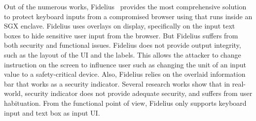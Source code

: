  Out of the numerous works, Fidelius~\cite{Fidelius} provides the most comprehensive solution to protect keyboard inputs from a compromised browser using \js that runs inside an SGX enclave. Fidelius uses overlays on display, specifically on the input text boxes to hide sensitive user input from the browser. But Fidelius suffers from both security and functional issues. Fidelius does not provide output integrity, such as the layout of the UI and the labels. This allows the attacker to change instruction on the screen to influence user such as changing the unit of an input value to a safety-critical device. Also, Fidelius relies on the overlaid information bar that works as a security indicator. Several research works show that in real-world, security indicator does not provide adequate security, and suffers from user habituation. From the functional point of view, Fidelius only supports keyboard input and text box as input UI.
 



